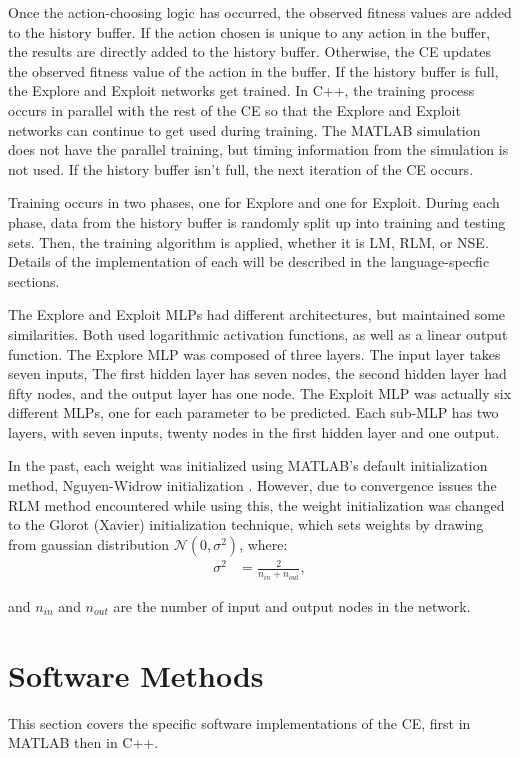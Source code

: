 \par Once the action-choosing logic has occurred, the observed fitness values are added to the history buffer. If the action chosen is unique to any action in the buffer, the results are directly added to the history buffer. Otherwise, the CE updates the observed fitness value of the action in the buffer. If the history buffer is full, the Explore and Exploit networks get trained. In C++, the training process occurs in parallel with the rest of the CE so that the Explore and Exploit networks can continue to get used during training. The MATLAB simulation does not have the parallel training, but timing information from the simulation is not used. If the history buffer isn't full, the next iteration of the CE occurs.
\par Training occurs in two phases, one for Explore and one for Exploit. During each phase, data from the history buffer is randomly split up into training and testing sets. Then, the training algorithm is applied, whether it is LM, RLM, or NSE. Details of the implementation of each will be described in the language-specfic sections. 
\par The Explore and Exploit MLPs had different architectures, but maintained some similarities. Both used logarithmic activation functions, as well as a linear output function. The Explore MLP was composed of three layers. The input layer takes seven inputs, The first hidden layer has seven nodes, the second hidden layer had fifty nodes, and the output layer has one node. The Exploit MLP was actually six different MLPs, one for each parameter to be predicted. Each sub-MLP has two layers, with seven  inputs, twenty nodes in the first hidden layer and one output. 
\par In the past, each weight was initialized using MATLAB's default initialization method, Nguyen-Widrow initialization \cite{nguyen_widrow}. However, due to convergence issues the RLM method encountered while using this, the weight initialization was changed to the Glorot (Xavier) initialization technique\cite{glorot_training}, which sets weights by drawing from gaussian distribution $\mathcal{N}(0,\sigma^2)$, where:
\begin{align*}
	\sigma^2 &= \frac{2}{n_{in}+n_{out}},
\end{align*} 
\par and $n_{in}$ and $n_{out}$ are the number of input and output nodes in the network.


\section{Software Methods}
\par This section covers the specific software implementations of the CE, first in MATLAB then in C++.
